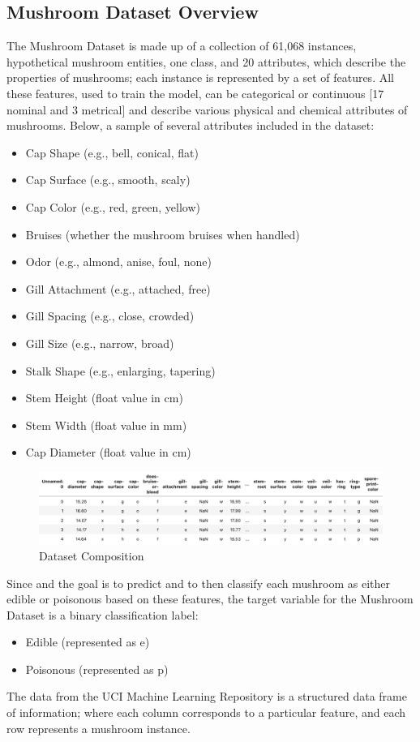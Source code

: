 \documentclass{article}
\begin{document}
\subsection{Mushroom Dataset Overview}
The Mushroom Dataset is made up of a collection of 61,068 instances, hypothetical mushroom entities, one class, and 20 attributes, which describe the properties of mushrooms; each instance is represented by a set of features. All these features, used to train the model, can be categorical or continuous [17 nominal and 3 metrical] and describe various physical and chemical attributes of mushrooms. 
Below, a sample of several attributes included in the dataset: 
\begin{itemize}
    \item Cap Shape (e.g., bell, conical, flat)
    \item Cap Surface (e.g., smooth, scaly)
    \item Cap Color (e.g., red, green, yellow)
    \item Bruises (whether the mushroom bruises when handled)
    \item Odor (e.g., almond, anise, foul, none)
    \item Gill Attachment (e.g., attached, free)
    \item Gill Spacing (e.g., close, crowded)
    \item Gill Size (e.g., narrow, broad)
    \item Stalk Shape (e.g., enlarging, tapering)
    \item Stem Height (float value in cm)
    \item Stem Width (float value in mm)
    \item Cap Diameter (float value in cm)
\end{itemize}


\begin{figure}[H]
\centering
\includegraphics[width=1\linewidth]{Dataset.png}
\caption{\label{fig:frog}Dataset Composition}
\end{figure}


Since and the goal is to predict and to then classify each mushroom as either edible or poisonous based on these features, the target variable for the Mushroom Dataset is a binary classification label:
\begin{itemize}
    \item Edible (represented as e)
    \item Poisonous (represented as p)
\end{itemize}
The data from the UCI Machine Learning Repository is a structured data frame of information; where each column corresponds to a particular feature, and each row represents a mushroom instance.
\end{document}
